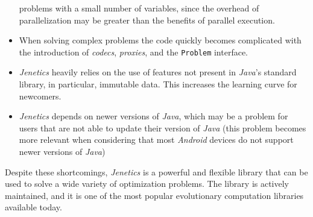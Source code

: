 \begin{itemize}
      problems with a small number of variables, since the overhead of
      parallelization may be greater than the benefits of parallel execution.
    \item When solving complex problems the code quickly becomes complicated
      with the introduction of \textit{codecs}, \textit{proxies}, and the 
      \texttt{Problem} interface.
    \item \textit{Jenetics} heavily relies on the use of features not present in
      \textit{Java}'s standard library, in particular, immutable data.
      This increases the learning curve for newcomers.
    \item \textit{Jenetics} depends on newer versions of \textit{Java}, which
      may be a problem for users that are not able to update their version of
      \textit{Java} (this problem becomes more relevant when considering that
      most \textit{Android} devices do not support newer versions of
      \textit{Java})
  \end{itemize}

  Despite these shortcomings, \textit{Jenetics} is a powerful and flexible
  library that can be used to solve a wide variety of optimization problems.
  The library is actively maintained, and it is one of the most popular
  evolutionary computation libraries available today.
